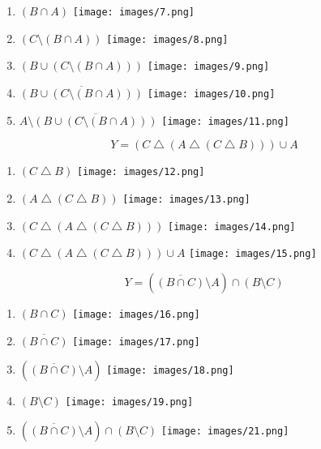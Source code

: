 \documentclass{article}
\begin{document}
\begin{enumerate}
    \item $(B \cap A)$
    \texttt{[image: images/7.png]}
    
    \item $(C \setminus (B \cap A))$
    \texttt{[image: images/8.png]}
    
    \item $(B \cup (C \setminus (B \cap A)))$
    \texttt{[image: images/9.png]}
    
    \item $\overline{(B \cup (C \setminus (B \cap A)))}$
    \texttt{[image: images/10.png]}
    
     \item $ A \setminus \overline{(B \cup (C \setminus (B \cap A)))}$
    \texttt{[image: images/11.png]}
\end{enumerate}

\noindent\makebox[\linewidth]{\rule{\paperwidth}{0.4pt}}

$$Y = (C \bigtriangleup (A \bigtriangleup (C \bigtriangleup B))) \cup A$$

\begin{enumerate}
    \item $(C \bigtriangleup B)$
    \texttt{[image: images/12.png]}
    
    \item $(A \bigtriangleup (C \bigtriangleup B))$
    \texttt{[image: images/13.png]}
    
    \item $(C \bigtriangleup (A \bigtriangleup (C \bigtriangleup B)))$
    \texttt{[image: images/14.png]}
    
    \item $(C \bigtriangleup (A \bigtriangleup (C \bigtriangleup B))) \cup A$
    \texttt{[image: images/15.png]}
    
\end{enumerate}

\noindent\makebox[\linewidth]{\rule{\paperwidth}{0.4pt}}

$$Y = (\overline{(B \cap C)} \setminus A) \cap (B \setminus C)$$

\begin{enumerate}
    \item $(B \cap C)$
    \texttt{[image: images/16.png]}
    
    \item $\overline{(B \cap C)}$
    \texttt{[image: images/17.png]}
    
    \item $(\overline{(B \cap C)} \setminus A)$
    \texttt{[image: images/18.png]}
    
    \item $(B \setminus C)$
    \texttt{[image: images/19.png]}
    
    \item $(\overline{(B \cap C)} \setminus A) \cap (B \setminus C)$
    \texttt{[image: images/21.png]}
\end{enumerate}
\end{document}
